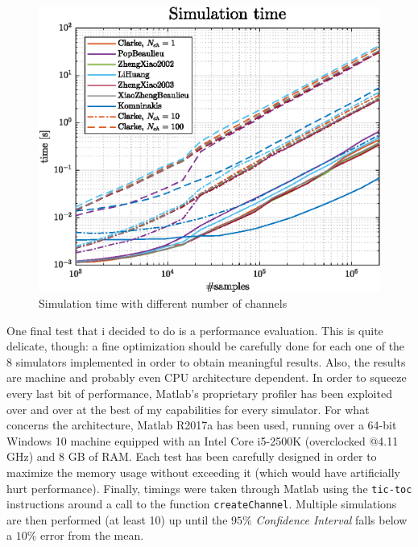 \begin{figure}
	\centering
	\includegraphics[width=\linewidth]{img/multiSimTime.eps}
	
	\caption{Simulation time with different number of channels}
	\label{fig:multiSimTime}
\end{figure}

One final test that i decided to do is a performance evaluation. This is quite delicate, though: a fine optimization should be carefully done for each one of the 8 simulators implemented in order to obtain meaningful results. Also, the results are machine and probably even CPU architecture dependent. In order to squeeze every last bit of performance, Matlab's proprietary profiler has been exploited over and over at the best of my capabilities for every simulator. For what concerns the architecture, Matlab R2017a has been used, running over a 64-bit Windows 10 machine equipped with an Intel Core i5-2500K (overclocked @4.11 GHz) and 8 GB of RAM. Each test has been carefully designed in order to maximize the memory usage without exceeding it (which would have artificially hurt performance). Finally, timings were taken through Matlab using the \texttt{tic-toc} instructions around a call to the function \texttt{createChannel}. Multiple simulations are then performed (at least 10) up until the $95\%$ \textit{Confidence Interval} falls below a $10\%$ error from the mean.

